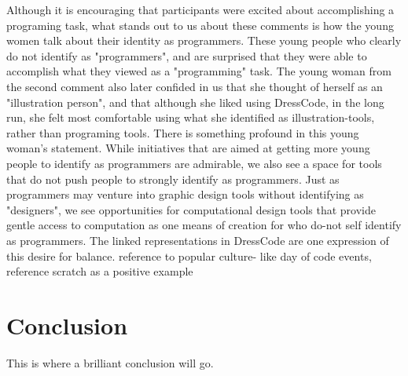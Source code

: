 \documentclass{sigchi}
\begin{document}
Although it is encouraging that participants were excited about accomplishing a programing task, what stands out to us about these comments is how the young women talk about their identity as programmers. These young people who clearly do not identify as "programmers", and are surprised that they were able to accomplish what they viewed as a "programming" task. The young woman from the second comment also later confided in us that she thought of herself as an "illustration person", and that although she liked using DressCode, in the long run, she felt most comfortable using what she identified as illustration-tools, rather than programing tools. 
There is something profound in this young woman's statement. While initiatives that are aimed at getting more young people to identify as programmers are admirable, we also see a space for tools that do not push people to strongly identify as programmers. Just as programmers may venture into graphic design tools without identifying as "designers", we see opportunities for computational design tools that provide gentle access to computation as one means of creation for who do-not self identify as programmers. The linked representations in DressCode are one expression of this desire for balance.
reference to popular culture- like day of code events, reference scratch as a positive example

\section{Conclusion}
This is where a brilliant conclusion will go.



\end{document}
